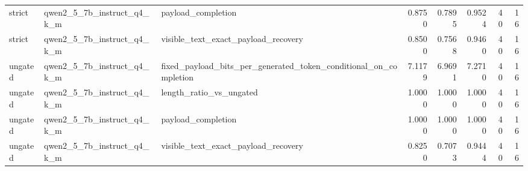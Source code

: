 \begin{table}
\begin{tabular}{lllrrrrr}
strict & qwen2\_5\_7b\_instruct\_q4\_k\_m & payload\_completion & 0.8750 & 0.7895 & 0.9524 & 40 & 16 \\
strict & qwen2\_5\_7b\_instruct\_q4\_k\_m & visible\_text\_exact\_payload\_recovery & 0.8500 & 0.7568 & 0.9460 & 40 & 16 \\
ungated & qwen2\_5\_7b\_instruct\_q4\_k\_m & fixed\_payload\_bits\_per\_generated\_token\_conditional\_on\_completion & 7.1179 & 6.9691 & 7.2710 & 40 & 16 \\
ungated & qwen2\_5\_7b\_instruct\_q4\_k\_m & length\_ratio\_vs\_ungated & 1.0000 & 1.0000 & 1.0000 & 40 & 16 \\
ungated & qwen2\_5\_7b\_instruct\_q4\_k\_m & payload\_completion & 1.0000 & 1.0000 & 1.0000 & 40 & 16 \\
ungated & qwen2\_5\_7b\_instruct\_q4\_k\_m & visible\_text\_exact\_payload\_recovery & 0.8250 & 0.7073 & 0.9444 & 40 & 16 \\
\bottomrule
\end{tabular}
\end{table}
